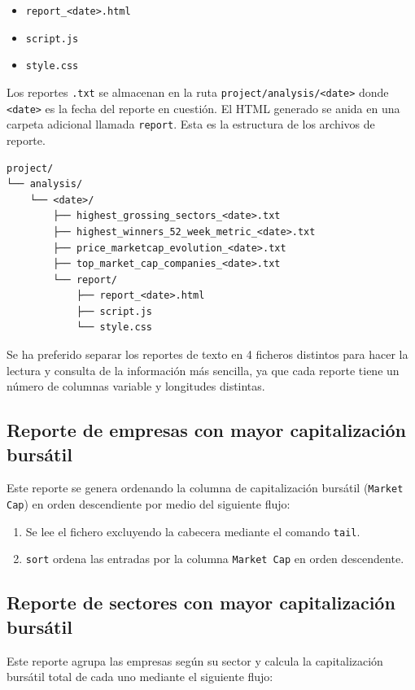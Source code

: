 \documentclass[11pt,a4paper]{article}
\begin{document}
\begin{itemize}[noitemsep]
\item \texttt{report\_<date>.html}
\item \texttt{script.js}
\item \texttt{style.css}
\end{itemize}

Los reportes \texttt{.txt} se almacenan en la ruta \texttt{project/analysis/<date>} donde \texttt{<date>} es la fecha del reporte en cuestión. El HTML generado se anida en una carpeta adicional llamada \texttt{report}. Esta es la estructura de los archivos de reporte.
\begin{verbatim}
project/
└── analysis/
    └── <date>/
        ├── highest_grossing_sectors_<date>.txt
        ├── highest_winners_52_week_metric_<date>.txt
        ├── price_marketcap_evolution_<date>.txt
        ├── top_market_cap_companies_<date>.txt
        └── report/
            ├── report_<date>.html
            ├── script.js
            └── style.css
\end{verbatim}

Se ha preferido separar los reportes de texto en 4 ficheros distintos para hacer la lectura y consulta de la información más sencilla, ya que cada reporte tiene un número de columnas variable y longitudes distintas.

\subsection{Reporte de empresas con mayor capitalización bursátil}
Este reporte se genera ordenando la columna de capitalización bursátil (\texttt{Market Cap}) en orden descendiente por medio del siguiente flujo:

\begin{enumerate}[noitemsep]
\item Se lee el fichero excluyendo la cabecera mediante el comando \texttt{tail}.
\item \texttt{sort} ordena las entradas por la columna \texttt{Market Cap} en orden descendente.
\end{enumerate}

\subsection{Reporte de sectores con mayor capitalización bursátil}

Este reporte agrupa las empresas según su sector y calcula la capitalización
bursátil total de cada uno mediante el siguiente flujo:
\end{document}

